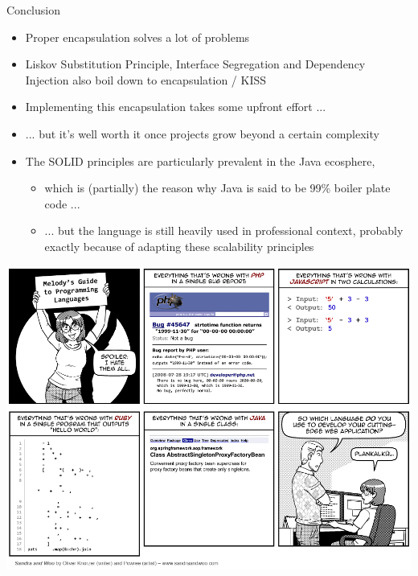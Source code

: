 \begin{frame}{Conclusion}
%
\begin{itemize}
\item Proper encapsulation solves a lot of problems
\item Liskov Substitution Principle, Interface Segregation and Dependency Injection also boil down to encapsulation / KISS
\item Implementing this encapsulation takes some upfront effort ...
\item ... but it's well worth it once projects grow beyond a certain complexity
\pause
\item The SOLID principles are particularly prevalent in the Java ecosphere,
	\begin{itemize}
	\item which is (partially) the reason why Java is said to be 99\% boiler plate code ...
	\item ... but the language is still heavily used in professional context, probably exactly because of adapting these scalability principles
	\end{itemize}
\end{itemize}
%
\end{frame}


\begin{frame}
%
\begin{center}
\includegraphics[width=.8\linewidth]{./gfx/16-saw-melodys-guide-to-programming-languages}
\end{center}
%
\end{frame}